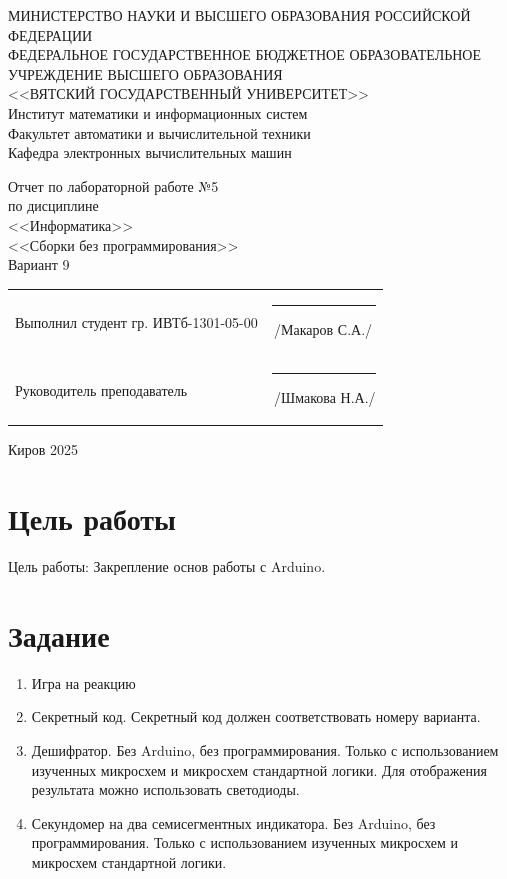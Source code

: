 \documentclass[a4paper,14pt]{extarticle}
\begin{document}
  \newpage\thispagestyle{empty}
  \begin{center}
    \MakeUppercase{
      Министерство науки и высшего образования Российской Федерации\\
      Федеральное государственное бюджетное образовательное учреждение высшего образования\\
      <<Вятский Государственный Университет>>\\
    }
    Институт математики и информационных систем\\
    Факультет автоматики и вычислительной техники\\
    Кафедра электронных вычислительных машин
  \end{center}
  \vfill

  \begin{center}
    Отчет по лабораторной работе №5\\
    по дисциплине\\
    <<Информатика>>\\
    <<Сборки без программирования>>\\
    Вариант 9
  \end{center}
  \vfill

  \noindent
  \begin{tabular}{ll}
    Выполнил студент гр. ИВТб-1301-05-00 \hspace{5mm} & \rule[-1mm]{25mm}{0.10mm}\,/Макаров С.А./ \\
    Руководитель преподаватель & \rule[-1mm]{25mm}{0.10mm}\,/Шмакова Н.А./ \\
  \end{tabular}

  \vfill
  \begin{center}
    Киров 2025
  \end{center}

  \newpage
  \section*{\hspace{12.5mm}Цель работы}
  Цель работы: Закрепление основ работы с Arduino.

  \section*{\hspace{12.5mm}Задание}
  \begin{enumerate}
    \item Игра на реакцию
    \item Секретный код. Секретный код должен соответствовать номеру варианта.
    \item Дешифратор. Без Arduino, без программирования. Только с использованием изученных микросхем и микросхем стандартной логики. Для отображения результата можно использовать светодиоды.
    \item Секундомер на два семисегментных индикатора. Без Arduino, без программирования. Только с использованием изученных микросхем и микросхем стандартной логики.
  \end{enumerate}
\end{document}
